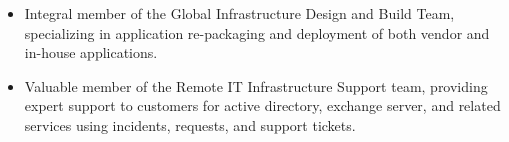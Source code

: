 \documentclass[10pt,a4paper]{altacv}
\begin{document}
\begin{itemize}
\item Integral member of the Global Infrastructure Design and Build Team, specializing in application re-packaging and deployment of both vendor and in-house applications.
\end{itemize}

\vspace{.2cm}

\begin{itemize}
\item Valuable member of the Remote IT Infrastructure Support team, providing expert support to customers for active directory, exchange server, and related services using incidents, requests, and support tickets.
\end{itemize}


\clearpage
\end{document}
